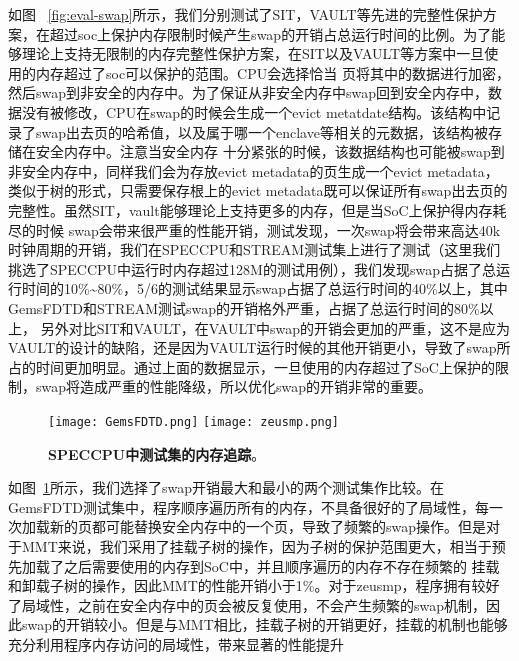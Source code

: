 如图 ~\ref{fig:eval-swap}所示，我们分别测试了SIT，VAULT等先进的完整性保护方案，在超过soc上保护内存限制时候产生swap的开销占总运行时间的比例。为了能够理论上支持无限制的内存完整性保护方案，在SIT以及VAULT等方案中一旦使用的内存超过了soc可以保护的范围。CPU会选择恰当
页将其中的数据进行加密，然后swap到非安全的内存中。为了保证从非安全内存中swap回到安全内存中，数据没有被修改，CPU在swap的时候会生成一个evict metatdate结构。该结构中记录了swap出去页的哈希值，以及属于哪一个enclave等相关的元数据，该结构被存储在安全内存中。注意当安全内存
十分紧张的时候，该数据结构也可能被swap到非安全内存中，同样我们会为存放evict metadata的页生成一个evict metadata，类似于树的形式，只需要保存根上的evict metadata既可以保证所有swap出去页的完整性。虽然SIT，vault能够理论上支持更多的内存，但是当SoC上保护得内存耗尽的时候
swap会带来很严重的性能开销，测试发现，一次swap将会带来高达40k时钟周期的开销，我们在SPECCPU和STREAM测试集上进行了测试（这里我们挑选了SPECCPU中运行时内存超过128M的测试用例），我们发现swap占据了总运行时间的10\%\sim 80\%，5/6的测试结果显示swap占据了总运行时间的40\%以上，其中GemsFDTD和STREAM测试swap的开销格外严重，占据了总运行时间的80\%以上，
另外对比SIT和VAULT，在VAULT中swap的开销会更加的严重，这不是应为VAULT的设计的缺陷，还是因为VAULT运行时候的其他开销更小，导致了swap所占的时间更加明显。通过上面的数据显示，一旦使用的内存超过了SoC上保护的限制，swap将造成严重的性能降级，所以优化swap的开销非常的重要。

\begin{figure}[!hbtp]
    \centering
                    {\texttt{[image: GemsFDTD.png]}}
    \hspace{1cm}
                    {\texttt{[image: zeusmp.png]}}
    \caption{\textbf{SPECCPU中测试集的内存追踪}。}
    \label{fig:bisubcaptionbox}
  \end{figure}
如图~\ref{fig:bisubcaptionbox}所示，我们选择了swap开销最大和最小的两个测试集作比较。在GemsFDTD测试集中，程序顺序遍历所有的内存，不具备很好的了局域性，每一次加载新的页都可能替换安全内存中的一个页，导致了频繁的swap操作。但是对于MMT来说，我们采用了挂载子树的操作，因为子树的保护范围更大，相当于预先加载了之后需要使用的内存到SoC中，并且顺序遍历的内存不存在频繁的
挂载和卸载子树的操作，因此MMT的性能开销小于1\%。对于zeusmp，程序拥有较好了局域性，之前在安全内存中的页会被反复使用，不会产生频繁的swap机制，因此swap的开销较小。但是与MMT相比，挂载子树的开销更好，挂载的机制也能够充分利用程序内存访问的局域性，带来显著的性能提升

